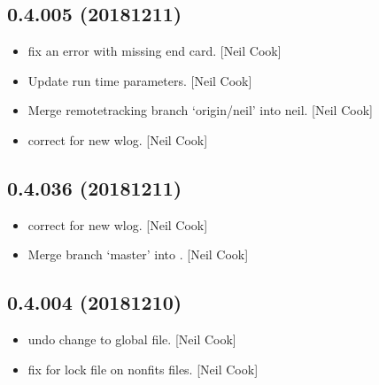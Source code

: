 \documentclass[a4paper,10pt,english]{report}
\begin{document}
\subsection{0.4.005 (2018\sphinxhyphen{}12\sphinxhyphen{}11)}
\label{\detokenize{misc/changelog:id258}}\begin{itemize}
\item {} 
 \sphinxhyphen{} fix an error with missing end card. {[}Neil Cook{]}

\item {} 
Update  run time parameters. {[}Neil Cook{]}

\item {} 
Merge remote\sphinxhyphen{}tracking branch ‘origin/neil’ into neil. {[}Neil Cook{]}

\item {} 
 \sphinxhyphen{} correct  for new wlog. {[}Neil
Cook{]}

\end{itemize}


\subsection{0.4.036 (2018\sphinxhyphen{}12\sphinxhyphen{}11)}
\label{\detokenize{misc/changelog:id259}}\begin{itemize}
\item {} 
 \sphinxhyphen{} correct  for new wlog. {[}Neil
Cook{]}

\item {} 
Merge branch ‘master’ into . {[}Neil Cook{]}

\end{itemize}


\subsection{0.4.004 (2018\sphinxhyphen{}12\sphinxhyphen{}10)}
\label{\detokenize{misc/changelog:id260}}\begin{itemize}
\item {} 
 \sphinxhyphen{} undo change to global file. {[}Neil Cook{]}

\item {} 
 \sphinxhyphen{} fix for lock file on non\sphinxhyphen{}fits files. {[}Neil Cook{]}

\end{itemize}
\end{document}

